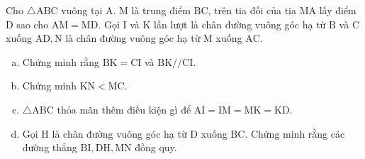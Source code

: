 \begin{bt}
	Cho $\triangle \mathrm{ABC}$ vuông tại $\mathrm{A}$. $\mathrm{M}$ là trung điểm $\mathrm{BC}$, trên tia đối của tia MA lấy điểm $\mathrm{D}$ sao cho $\mathrm{AM}=\mathrm{MD}$. Gọi $\mathrm{I}$ và $\mathrm{K}$ lần lượt là chân đường vuông góc hạ từ $\mathrm{B}$ và $\mathrm{C}$ xuống $\mathrm{AD}, \mathrm{N}$ là chân đường vuông góc hạ từ $\mathrm{M}$ xuống $\mathrm{AC}$.
	\begin{enumerate}[a.]
		\item Chứng minh rằng $\mathrm{BK}=\mathrm{CI}$ và $\mathrm{BK} / / \mathrm{CI}$.
		\item Chứng minh $\mathrm{KN}<\mathrm{MC}$.
		\item $\triangle \mathrm{ABC}$ thỏa mãn thêm điều kiện gì để $\mathrm{AI}=\mathrm{IM}=\mathrm{MK}=\mathrm{KD}$.
		\item Gọi $\mathrm{H}$ là chân đường vuông góc hạ từ $\mathrm{D}$ xuống $\mathrm{BC}$. Chứng minh rằng các đường thẳng $\mathrm{BI}, \mathrm{DH}, \mathrm{MN}$ đồng quy.
	\end{enumerate}
	\loigiai{}
\end{bt}

